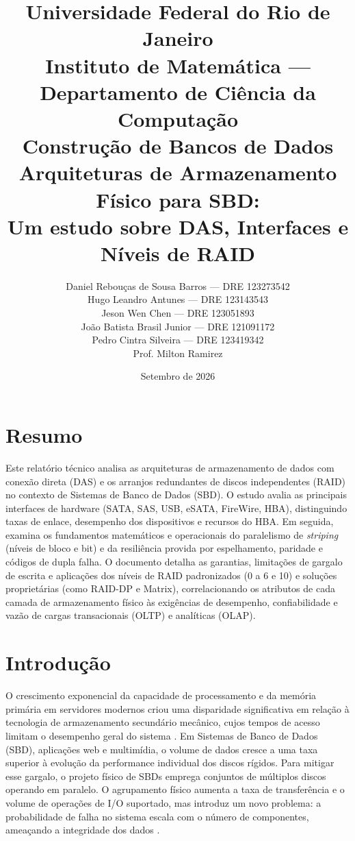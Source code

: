\documentclass[titlepage]{article}
\title{
    \vspace{-1cm}
    {\large Universidade Federal do Rio de Janeiro}\\
    {\large Instituto de Matemática --- Departamento de Ciência da Computação}\\
    {\large Construção de Bancos de Dados}\\[1.5cm]
    \textbf{Arquiteturas de Armazenamento Físico para SBD:}\\
    \textbf{Um estudo sobre DAS, Interfaces e Níveis de RAID}
}
\author{
    Daniel Rebouças de Sousa Barros --- DRE 123273542 \\
    Hugo Leandro Antunes --- DRE 123143543 \\
    Jeson Wen Chen --- DRE 123051893 \\
    João Batista Brasil Junior --- DRE 121091172 \\
    Pedro Cintra Silveira --- DRE 123419342 \\[1.5cm]
    {\normalsize Prof. Milton Ramirez}
}
\date{Setembro de 2026}
\begin{document}
\maketitle

{\color{black}{\tableofcontents}}
\newpage

\section*{Resumo}
Este relatório técnico analisa as arquiteturas de armazenamento de dados com conexão direta (DAS) e os arranjos redundantes de discos independentes (RAID) no contexto de Sistemas de Banco de Dados (SBD). O estudo avalia as principais interfaces de hardware (SATA, SAS, USB, eSATA, FireWire, HBA), distinguindo taxas de enlace, desempenho dos dispositivos e recursos do HBA. Em seguida, examina os fundamentos matemáticos e operacionais do paralelismo de \textit{striping} (níveis de bloco e bit) e da resiliência provida por espelhamento, paridade e códigos de dupla falha. O documento detalha as garantias, limitações de gargalo de escrita e aplicações dos níveis de RAID padronizados (0 a 6 e 10) e soluções proprietárias (como RAID-DP e Matrix), correlacionando os atributos de cada camada de armazenamento físico às exigências de desempenho, confiabilidade e vazão de cargas transacionais (OLTP) e analíticas (OLAP).

\section{Introdução}
\label{sec:introducao}
O crescimento exponencial da capacidade de processamento e da memória primária em servidores modernos criou uma disparidade significativa em relação à tecnologia de armazenamento secundário mecânico, cujos tempos de acesso limitam o desempenho geral do sistema \cite{elmasri2016}. Em Sistemas de Banco de Dados (SBD), aplicações web e multimídia, o volume de dados cresce a uma taxa superior à evolução da performance individual dos discos rígidos. Para mitigar esse gargalo, o projeto físico de SBDs emprega conjuntos de múltiplos discos operando em paralelo. O agrupamento físico aumenta a taxa de transferência e o volume de operações de I/O suportado, mas introduz um novo problema: a probabilidade de falha no sistema escala com o número de componentes, ameaçando a integridade dos dados \cite{silberschatz2020}.
\end{document}
